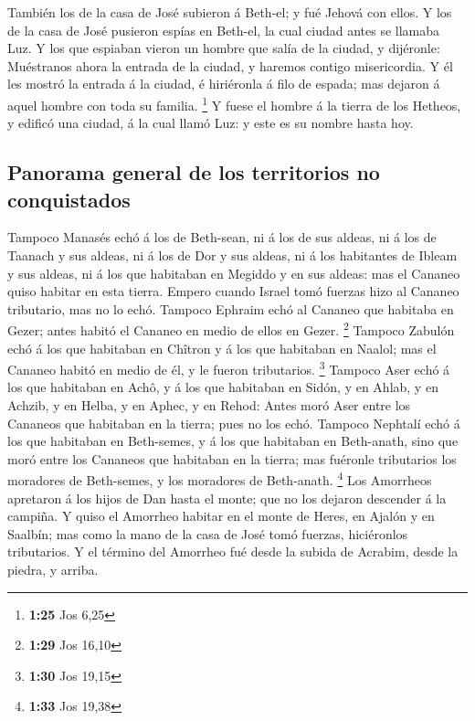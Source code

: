  También los de la casa de José subieron á Beth-el; y fué
Jehová con ellos.  Y los de la casa de José pusieron espías
en Beth-el, la cual ciudad antes se llamaba Luz.  Y los que
espiaban vieron un hombre que salía de la ciudad, y dijéronle:
Muéstranos ahora la entrada de la ciudad, y haremos contigo
misericordia.  Y él les mostró la entrada á la ciudad, é
hiriéronla á filo de espada; mas dejaron á aquel hombre con toda su
familia. \footnote{\textbf{1:25} Jos 6,25}  Y fuese el
hombre á la tierra de los Hetheos, y edificó una ciudad, á la cual llamó
Luz: y este es su nombre hasta hoy.

\hypertarget{panorama-general-de-los-territorios-no-conquistados}{%
\subsection{Panorama general de los territorios no
conquistados}\label{panorama-general-de-los-territorios-no-conquistados}}

 Tampoco Manasés echó á los de Beth-sean, ni á los de sus
aldeas, ni á los de Taanach y sus aldeas, ni á los de Dor y sus aldeas,
ni á los habitantes de Ibleam y sus aldeas, ni á los que habitaban en
Megiddo y en sus aldeas: mas el Cananeo quiso habitar en esta tierra.
 Empero cuando Israel tomó fuerzas hizo al Cananeo
tributario, mas no lo echó.  Tampoco Ephraim echó al
Cananeo que habitaba en Gezer; antes habitó el Cananeo en medio de ellos
en Gezer. \footnote{\textbf{1:29} Jos 16,10}  Tampoco
Zabulón echó á los que habitaban en Chîtron y á los que habitaban en
Naalol; mas el Cananeo habitó en medio de él, y le fueron tributarios.
\footnote{\textbf{1:30} Jos 19,15}  Tampoco Aser echó á los
que habitaban en Achô, y á los que habitaban en Sidón, y en Ahlab, y en
Achzib, y en Helba, y en Aphec, y en Rehod:  Antes moró
Aser entre los Cananeos que habitaban en la tierra; pues no los echó.
 Tampoco Nephtalí echó á los que habitaban en Beth-semes, y
á los que habitaban en Beth-anath, sino que moró entre los Cananeos que
habitaban en la tierra; mas fuéronle tributarios los moradores de
Beth-semes, y los moradores de Beth-anath. \footnote{\textbf{1:33} Jos
  19,38}  Los Amorrheos apretaron á los hijos de Dan hasta
el monte; que no los dejaron descender á la campiña.  Y
quiso el Amorrheo habitar en el monte de Heres, en Ajalón y en Saalbín;
mas como la mano de la casa de José tomó fuerzas, hiciéronlos
tributarios.  Y el término del Amorrheo fué desde la subida
de Acrabim, desde la piedra, y arriba.

